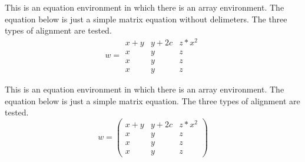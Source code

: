 ﻿\documentclass{article}
\begin{document}
This is an equation environment in which there is an array environment.  The equation below
is just a simple matrix equation without delimeters.  The three types of alignment are
tested.  
\begin{equation*}
w =  
\begin{array}{lcr}
x+y & y+2c & z * x^2 \\
x & y & z \\
x & y & z \\
x & y & z 
\end{array}
\end{equation*}

This is an equation environment in which there is an array environment.  The equation below
is just a simple matrix equation.  The three types of alignment are
tested.  
\begin{equation}
w = \left( 
\begin{array}{lcr}
x+y & y+2c & z * x^2 \\
x & y & z \\
x & y & z \\
x & y & z 
\end{array}
\right)
\end{equation}
\end{document}
